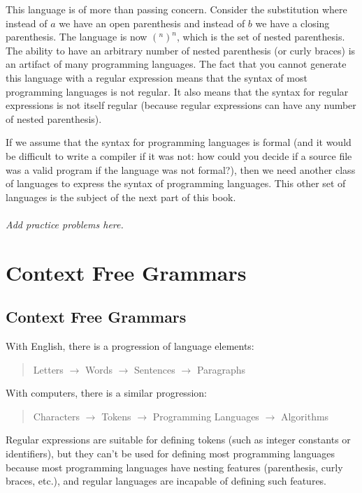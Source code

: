 \documentclass[letterpaper,12pt,openany,reqno]{book}%
\newcommand{\needsproblems}{\paragraph{Add practice problems here.}}
\begin{document}
This language is of more than passing concern. Consider the substitution where instead of $a$ we have an open parenthesis and instead of $b$ we have a closing parenthesis. The language is now $(^n )^n$, which is the set of nested parenthesis. The ability to have an arbitrary number of nested parenthesis (or curly braces) is an artifact of many programming languages. The fact that you cannot generate this language with a regular expression means that the syntax of most programming languages is not regular. It also means that the syntax for regular expressions is not itself regular (because regular expressions can have any number of nested parenthesis).

If we assume that the syntax for programming languages is formal (and it would be difficult to write a compiler if it was not: how could you decide if a source file was a valid program if the language was not formal?), then we need another class of languages to express the syntax of programming languages. This other set of languages is the subject of the next part of this book.

\needsproblems

\part{Context Free Grammars}

\chapter{Context Free Grammars}
With English, there is a progression of language elements:
\begin{quote}
Letters $\rightarrow$ Words $\rightarrow$ Sentences $\rightarrow$ Paragraphs
\end{quote}
With computers, there is a similar progression:
\begin{quote}
Characters $\rightarrow$ Tokens $\rightarrow$ Programming Languages $\rightarrow$ Algorithms
\end{quote}

Regular expressions are suitable for defining tokens (such as integer constants or identifiers), but they can't be used for defining most programming languages because most programming languages have nesting features (parenthesis, curly braces, etc.), and regular languages are incapable of defining such features. 
\end{document}
